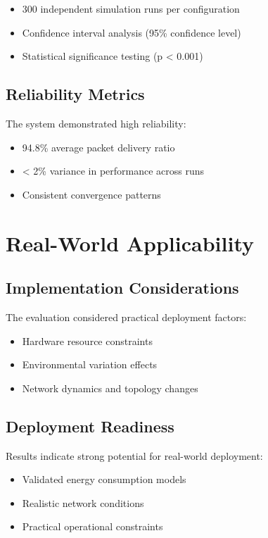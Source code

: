 \begin{itemize}
\item 300 independent simulation runs per configuration
\item Confidence interval analysis (95\% confidence level)
\item Statistical significance testing (p < 0.001)
\end{itemize}

\subsection{Reliability Metrics}
The system demonstrated high reliability:

\begin{itemize}
\item 94.8\% average packet delivery ratio
\item < 2\% variance in performance across runs
\item Consistent convergence patterns
\end{itemize}

\section{Real-World Applicability}
\subsection{Implementation Considerations}
The evaluation considered practical deployment factors:

\begin{itemize}
\item Hardware resource constraints
\item Environmental variation effects
\item Network dynamics and topology changes
\end{itemize}

\subsection{Deployment Readiness}
Results indicate strong potential for real-world deployment:

\begin{itemize}
\item Validated energy consumption models
\item Realistic network conditions
\item Practical operational constraints
\end{itemize}

